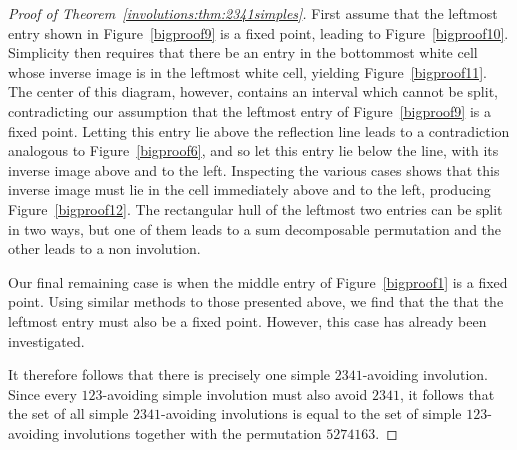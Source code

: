 \begin{proof}[Proof of Theorem~\ref{involutions:thm:2341simples}]
        First assume that the leftmost entry shown in Figure~\ref{bigproof9} is a
        fixed point, leading to Figure~\ref{bigproof10}. Simplicity then
        requires that there be an entry in the bottommost white cell whose
        inverse image is in the leftmost white cell, yielding
        Figure~\ref{bigproof11}. The center of this diagram, however, contains
        an interval which cannot be split, contradicting our assumption that
        the leftmost entry of Figure~\ref{bigproof9} is a fixed point.
        Letting this entry lie above the reflection line leads to a
        contradiction analogous to Figure~\ref{bigproof6}, and so let this
        entry lie below the line, with its inverse image above and to the left.
        Inspecting the various cases shows that this inverse image must lie in
        the cell immediately above and to the left, producing
        Figure~\ref{bigproof12}. The rectangular hull of the leftmost two
        entries can be split in two ways, but one of them leads to a sum
        decomposable permutation and the other leads to a non involution. 

        
        Our final remaining case is when the middle entry of
        Figure~\ref{bigproof1} is a fixed point. Using similar methods to those
        presented above, we find that the that the leftmost entry must also be
        a fixed point. However, this case has already been investigated. 

        
        It therefore follows that there is precisely one simple $2341$-avoiding
        involution.  Since every $123$-avoiding simple involution must also
        avoid $2341$, it follows that the set of all simple $2341$-avoiding
        involutions is equal to the set of simple $123$-avoiding involutions
        together with the permutation $5274163$. 
        
      \end{proof}

